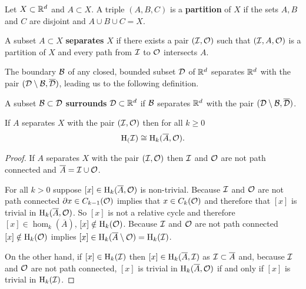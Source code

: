 
Let $X\subset \mathbb{R}^d$ and $A\subset X$.
A triple $(A,B,C)$ is a \textbf{partition} of $X$ if the sets $A, B$ and $C$ are disjoint and $A\cup B\cup C = X$.
\begin{definition}
    A subset $A\subset X$ \textbf{separates} $X$ if there exists a pair $({\mathcal{I}},\mathcal{O})$ such that $({\mathcal{I}}, A, \mathcal{O})$ is a partition of $X$ and every path from ${\mathcal{I}}$ to $\mathcal{O}$ intersects $A$.
\end{definition}
The boundary ${\mathcal{B}}$ of any closed, bounded subset ${\mathcal{D}}$ of $\mathbb{R}^d$ separates $\mathbb{R}^d$ with the pair $({\mathcal{D}}\setminus{\mathcal{B}}, \overline{{\mathcal{D}}})$, leading us to the following definition.
\begin{definition}
    A subset ${\mathcal{B}}\subset {\mathcal{D}}$ \textbf{surrounds} ${\mathcal{D}}\subset\mathbb{R}^d$ if ${\mathcal{B}}$ separates $\mathbb{R}^d$ with the pair $({\mathcal{D}}\setminus{\mathcal{B}}, \overline{{\mathcal{D}}})$.
\end{definition}

\begin{lemma}
    If $A$ separates $X$ with the pair $({\mathcal{I}}, \mathcal{O})$ then for all $k\geq 0$
    \[ \mathrm{H}_({\mathcal{I}})\cong\mathrm{H}_k(\overline{A}, \mathcal{O}). \]
\end{lemma}
\begin{proof}
    If $A$ separates $X$ with the pair $({\mathcal{I}}, \mathcal{O})$ then ${\mathcal{I}}$ and $\mathcal{O}$ are not path connected and $\overline{A} = {\mathcal{I}}\cup\mathcal{O}$.

    For all $k > 0$ suppose $[x]\in \mathrm{H}_k(\overline{A}, \mathcal{O})$ is non-trivial.
    Because ${\mathcal{I}}$ and $\mathcal{O}$ are not path connected $\partial x \in C_{k-1}(\mathcal{O})$ implies that $x\in C_k(\mathcal{O})$ and therefore that $[x]$ is trivial in $\mathrm{H}_k(\overline{A}, \mathcal{O})$.
    So $[x]$ is not a relative cycle and therefore $[x]\in \hom_k(\overline{A})$, $[x]\notin\mathrm{H}_k(\mathcal{O})$.
    Because ${\mathcal{I}}$ and $\mathcal{O}$ are not path connected $[x]\notin\mathrm{H}_k(\mathcal{O})$ implies $[x]\in \mathrm{H}_k(\overline{A}\setminus\mathcal{O}) = \mathrm{H}_k({\mathcal{I}})$.

    On the other hand, if $[x]\in \mathrm{H}_k({\mathcal{I}})$ then $[x]\in \mathrm{H}_k(\overline{A}, {\mathcal{I}})$ as ${\mathcal{I}}\subset\overline{A}$ and, because ${\mathcal{I}}$ and $\mathcal{O}$ are not path connected, $[x]$ is trivial in $\mathrm{H}_k(\overline{A}, \mathcal{O})$ if and only if $[x]$ is trivial in $\mathrm{H}_k({\mathcal{I}})$.
\end{proof}

